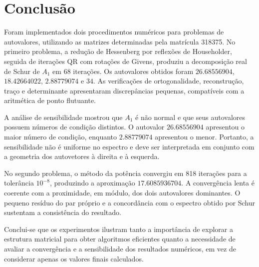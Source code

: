 \section{Conclusão}

Foram implementados dois procedimentos numéricos para problemas de autovalores, utilizando as matrizes determinadas pela matrícula 318375. No primeiro problema, a redução de Hessenberg por reflexões de Householder, seguida de iterações QR com rotações de Givens, produziu a decomposição real de Schur de \(A_1\) em 68 iterações. Os autovalores obtidos foram \(26.68556904\), \(18.42664022\), \(2.88779074\) e \(34\). As verificações de ortogonalidade, reconstrução, traço e determinante apresentaram discrepâncias pequenas, compatíveis com a aritmética de ponto flutuante.

A análise de sensibilidade mostrou que \(A_1\) é não normal e que seus autovalores possuem números de condição distintos. O autovalor \(26.68556904\) apresentou o maior número de condição, enquanto \(2.88779074\) apresentou o menor. Portanto, a sensibilidade não é uniforme no espectro e deve ser interpretada em conjunto com a geometria dos autovetores à direita e à esquerda.

No segundo problema, o método da potência convergiu em 818 iterações para a tolerância \(10^{-8}\), produzindo a aproximação \(17.6085936704\). A convergência lenta é coerente com a proximidade, em módulo, dos dois autovalores dominantes. O pequeno resíduo do par próprio e a concordância com o espectro obtido por Schur sustentam a consistência do resultado.

Conclui-se que os experimentos ilustram tanto a importância de explorar a estrutura matricial para obter algoritmos eficientes quanto a necessidade de avaliar a convergência e a sensibilidade dos resultados numéricos, em vez de considerar apenas os valores finais calculados.
